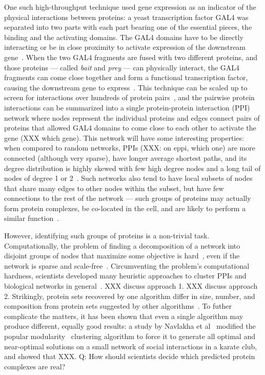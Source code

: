 One such high-throughput technique used gene expression as an indicator of the physical interactions between proteins: a yeast transcription factor GAL4 was separated into two parts with each part bearing one of the essential pieces, the binding and the activating domains. The GAL4 domains have to be directly interacting or be in close proximity to activate expression of the downstream gene~\cite{XXX}. When the two GAL4 fragments are fused with two different proteins, and those proteins --- called \textit{bait} and \textit{prey} --- can physically interact, the GAL4 fragments can come close together and form a functional transcription factor, causing the downstream gene to express~\cite{XXX}. This technique can be scaled up to screen for interactions over hundreds of protein pairs~\cite{Ito 2001}, and the pairwise protein interactions can be summarized into a single protein-protein interaction (PPI) network where nodes represent the individual proteins and edges connect pairs of proteins that allowed GAL4 domains to come close to each other to activate the gene (XXX which gene). This network will have some interesting properties: when compared to random networks, PPIs (XXX: on eppi, which one) are more connected (although very sparse), have longer average shortest paths, and its degree distribution is highly skewed with few high degree nodes and a long tail of nodes of degree 1 or 2~\cite{Zhu et al 2007}. Such networks also tend to have local subsets of nodes that share many edges to other nodes within the subset, but have few connections to the rest of the network --- such groups of proteins may actually form protein complexes, be co-located in the cell, and are likely to perform a similar function~\cite{ProteinComplexesPPI}.



However, identifying such groups of proteins is a non-trivial task. Computationally, the problem of finding a decomposition of a network into disjoint groups of nodes that maximize some objective is hard~\cite{ModularityNPhard}, even if the network is sparse and scale-free~\cite{XXX}. Circumventing the problem's computational hardness, scientists developed many heuristic approaches to cluster PPIs and biological networks in general~\cite{ReviewBiologicalNetworksclustering}. XXX discuss approach 1. XXX discuss approach 2. Strikingly, protein sets recovered by one algorithm differ in size, number, and composition from protein sets suggested by other algorithms~\cite{blah}. To futher complicate the matters, it has been shown that even a single algorithm may produce different, equally good results: a study by Navlakha et al~\cite{SaketModularity} modified the popular modularity~\cite{Modularity} clustering algorithm to force it to generate all optimal and near-optimal solutions on a small network of social interactions in a karate club, and showed that XXX. Q: How should scientists decide which predicted protein complexes are real?


